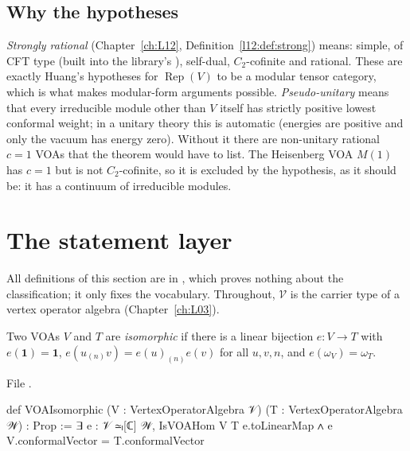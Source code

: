 \subsection{Why the hypotheses}

\emph{Strongly rational} (Chapter~\ref{ch:L12}, Definition~\ref{l12:def:strong}) means: simple, of CFT type
(built into the library's ), self-dual, $C_2$-cofinite and rational. These are
exactly Huang's hypotheses for $\operatorname{Rep}(V)$ to be a modular tensor category, which is what makes
modular-form arguments possible. \emph{Pseudo-unitary} means that every irreducible module other than $V$
itself has strictly positive lowest conformal weight; in a unitary theory this is automatic (energies are
positive and only the vacuum has energy zero). Without it there are non-unitary rational $c=1$ VOAs that the
theorem would have to list. The Heisenberg VOA $M(1)$ has $c=1$ but is not $C_2$-cofinite, so it is excluded by
the hypothesis, as it should be: it has a continuum of irreducible modules.

\section{The statement layer}\label{l22:sec:statement}

All definitions of this section are in ,
which proves nothing about the classification; it only fixes the vocabulary. Throughout, $\mathcal V$ is the
carrier type of a vertex operator algebra  (Chapter~\ref{ch:L03}).

\begin{definition}\label{l22:def:iso}
Two VOAs $V$ and $T$ are \emph{isomorphic} if there is a linear bijection $e:V\to T$ with
$e(\mathbf 1)=\mathbf 1$, $e(u_{(n)}v) = e(u)_{(n)}e(v)$ for all $u,v,n$, and $e(\omega_V)=\omega_T$.
\end{definition}
\noindent File .
\begin{leancode}
def VOAIsomorphic (V : VertexOperatorAlgebra 𝒱) (T : VertexOperatorAlgebra 𝒲) : Prop :=
  ∃ e : 𝒱 ≃ₗ[ℂ] 𝒲, IsVOAHom V T e.toLinearMap ∧ e V.conformalVector = T.conformalVector
\end{leancode}


